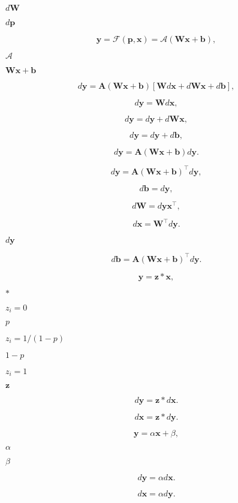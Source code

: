 \documentclass{article}
\begin{document}
$d\mathbf{W}$
\pagebreak

$d\mathbf{p}$
\pagebreak

\[ \mathbf{y} = \mathcal{F}(\mathbf{p}, \mathbf{x})
 = \mathcal{A}(\mathbf{Wx+b}),\]
\pagebreak

$\mathcal{A}$
\pagebreak

$\mathbf{Wx+b}$
\pagebreak

\[d\mathbf{y} = \mathbf{A}(\mathbf{Wx+b})[\mathbf{W}d
 \mathbf{x}+d\mathbf{Wx}+d\mathbf{b}],\]
\pagebreak

\[d\mathbf{y} = \mathbf{W}d\mathbf{x},\]
\pagebreak

\[d\mathbf{y} = d\mathbf{y} + d\mathbf{Wx},\]
\pagebreak

\[d\mathbf{y} = d\mathbf{y} + d\mathbf{b},\]
\pagebreak

\[d\mathbf{y} = \mathbf{A}(\mathbf{Wx+b})d\mathbf{y}.\]
\pagebreak

\[d\mathbf{y} = \mathbf{A}(\mathbf{Wx+b})^{\top}d\mathbf{y},\]
\pagebreak

\[d\mathbf{b} = d\mathbf{y},\]
\pagebreak

\[d\mathbf{W} = d\mathbf{yx}^{\top},\]
\pagebreak

\[d\mathbf{x} = \mathbf{W}^{\top}d\mathbf{y}.\]
\pagebreak

$d\mathbf{y}$
\pagebreak

\[d\mathbf{b} = \mathbf{A}(\mathbf{Wx+b})^{\top}d\mathbf{y}.\]
\pagebreak

\[\mathbf{y} = \mathbf{z}*\mathbf{x},\]
\pagebreak

$*$
\pagebreak

$z_{i}=0$
\pagebreak

$p$
\pagebreak

$z_{i}=1/(1-p)$
\pagebreak

$1-p$
\pagebreak

$z_{i}=1$
\pagebreak

$\mathbf{z}$
\pagebreak

\[d\mathbf{y} = \mathbf{z}*d\mathbf{x}.\]
\pagebreak

\[d\mathbf{x} = \mathbf{z}*d\mathbf{y}.\]
\pagebreak

\[\mathbf{y} = \alpha \mathbf{x} + \beta,\]
\pagebreak

$\alpha$
\pagebreak

$\beta$
\pagebreak

\[d\mathbf{y} = \alpha d\mathbf{x}.\]
\pagebreak

\[d\mathbf{x} = \alpha d\mathbf{y}.\]
\pagebreak
\end{document}
